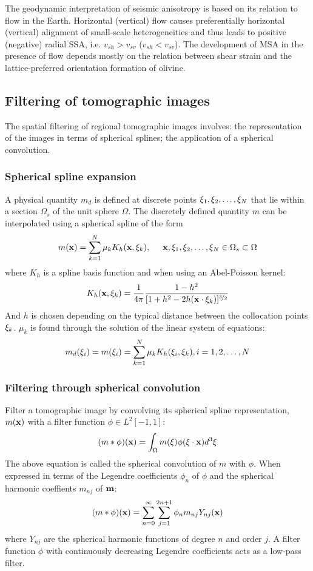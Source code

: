 The geodynamic interpretation of seismic anisotropy is based on its relation to flow in the Earth.
Horizontal (vertical) flow causes preferentially horizontal (vertical) alignment
of small-scale heterogeneities and thus leads to positive (negative) radial SSA,
i.e. $v_{sh}>v_{sv}$ ($v_{sh}<v_{sv}$).
The development of MSA in the presence of flow depends mostly on the relation
between shear strain and the lattice-preferred orientation formation of olivine.

\subsection{Filtering of tomographic images}
The spatial filtering of regional tomographic images involves:
the representation of the images in terms of spherical splines;
the application of a spherical convolution.

\subsubsection{Spherical spline expansion}
A physical quantity $m_d$ is defined at discrete points $\mathbf{\xi}_1,\mathbf{\xi}_2,\ldots,\mathbf{\xi}_N$
that lie within a section $\Omega_s$ of the unit sphere $\Omega$.
The discretely defined quantity $m$ can be interpolated using a spherical spline of the form
\[ m(\mathbf{x})=\sum_{k=1}^N\mu_kK_h(\mathbf{x},\mathbf{\xi}_k), \hspace{5mm} \mathbf{x},\mathbf{\xi}_1,\mathbf{\xi}_2,\ldots,\mathbf{\xi}_N\in\Omega_s\subset\Omega  \]
where $K_h$ is a spline basis function and when using an Abel-Poisson kernel:
\[ K_h(\mathbf{x},\mathbf{\xi}_k)=\frac{1}{4\pi}\frac{1-h^2}{[1+h^2-2h(\mathbf{x}\cdot\mathbf{\xi}_k)]^{\nicefrac{3}{2}}} \]
And $h$ is chosen depending on the typical distance between the collocation points $\mathbf{\xi}_k$.
$\mu_k$ is found through the solution of the linear system of equations:
\[ m_d(\mathbf{\xi}_i)=m(\mathbf{\xi}_i)=\sum_{k=1}^N\mu_kK_h(\mathbf{\xi}_i,\mathbf{\xi}_k),i=1,2,\ldots,N \]

\subsubsection{Filtering through spherical convolution}
Filter a tomographic image by convolving its spherical spline representation,
$m(\mathbf{x})$ with a filter function $\phi\in L^2[-1,1]$:
\[ (m*\phi)(\mathbf{x})=\int_\Omega m(\mathbf{\xi})\phi(\mathbf{\xi}\cdot\mathbf{x})d^3\mathbf{\xi} \]
The above equation is called the spherical convolution of $m$ with $\phi$.
When expressed in terms of the Legendre coefficients $\phi_n$ of $\phi$
and the spherical harmonic coeffients $m_{nj}$ of $\mathbf{m}$:
\[ (m*\phi)(\mathbf{x})=\sum_{n=0}^\infty\sum_{j=1}^{2n+1}\phi_nm_{nj}Y_{nj}(\mathbf{x}) \]
where $Y_{nj}$ are the spherical harmonic functions of degree $n$ and order $j$.
A filter function $\phi$ with continuously decreasing Legendre coefficients
acts as a low-pass filter.

